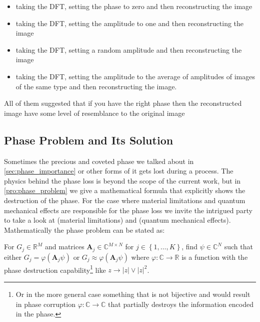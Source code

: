  \begin{itemize}
	\item taking the \ac{DFT}, setting the phase to zero and then reconstructing the image
  \item taking the \ac{DFT}, setting the amplitude to one and then reconstructing the image
	\item taking the \ac{DFT}, setting a random amplitude and then reconstructing the image
	\item taking the \ac{DFT}, setting the amplitude to the average of amplitudes of images of the same type and then reconstructing the image.
 \end{itemize} 
 All of them suggested that if you have the right phase then the reconstructed image have some level of resemblance to the original image \cite{Oppenheim1981}   

\subsection{Phase Problem and Its Solution}
Sometimes the precious and coveted phase we talked about in \cref{sec:phase_importance} or other forms of it gets lost during a process. The physics behind the phase loss is beyond the scope of the current work, but 
in \cref{pro:phase_problem} we give a mathematical formula that explicitly shows the destruction of the phase. 
For the case where material limitations and quantum mechanical effects are responsible for the phase loss we invite 
the intrigued party to take a look at \cite{Shechtman2015} (material limitations) and \cite{DGDS2018}\cite{FranzSchwabl2007} (quantum mechanical effects). 
Mathematically the phase problem can be stated as:
\begin{Pro}\label{pro:phase_problem} For $G_j \in \mathbb{R}^M$ and matrices 
  $\boldsymbol{A}_j \in \mathbb{C}^{M \times N}$ for $j \in \left\{1,\ldots,K\right\}$, find 
$\psi \in \mathbb{C}^N$ such that either $G_j = \varphi(\boldsymbol{A}_j\psi)$ or $G_j \approx \varphi(\boldsymbol{A}_j\psi)$ where 
$\varphi \colon \mathbb{C} \to \mathbb{R}$ is a function with the phase destruction 
capability\footnote{Or in the more general case something that is not bijective and would result in phase corruption $\varphi \colon \mathbb{C} \to \mathbb{C}$ 
that partially destroys the information encoded in the phase.} like $z \rightarrow \left|z\right| \lor {\left|z\right|^2}$. 
\end{Pro} 

